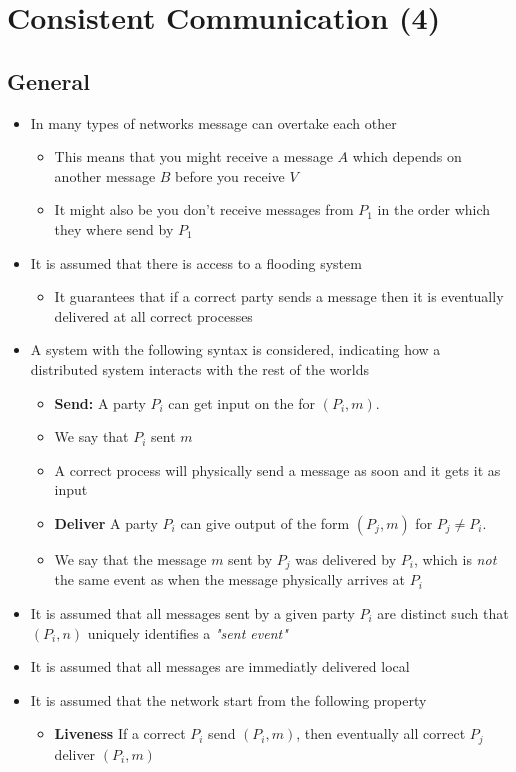 \documentclass[11pt]{article}
\begin{document}
\section{Consistent Communication (4)}
\label{sec:orga70dfb3}
\subsection{General}
\label{sec:orgbbf9d57}
\begin{itemize}
\item In many types of networks message can overtake each other
\begin{itemize}
\item This means that you might receive a message \(A\) which depends on another message \(B\) before you receive \(V\)
\item It might also be you don't receive messages from \(P_1\) in the order which they where send by \(P_1\)
\end{itemize}

\item It is assumed that there is access to a flooding system
\begin{itemize}
\item It guarantees that if a correct party sends a message then it is eventually delivered at all correct processes
\end{itemize}

\item A system with the following syntax is considered, indicating how a distributed system interacts with the rest of the worlds
\begin{itemize}
\item \textbf{Send:} A party \(P_i\) can get input on the for \((P_i,m)\).
\item We say that \(P_i\) sent \(m\)
\item A correct process will physically send a message as soon and it gets it as input
\item \textbf{Deliver} A party \(P_i\) can give output of the form \((P_j,m)\) for \(P_j \ne P_i\).
\item We say that the message \(m\) sent by \(P_j\) was delivered by \(P_i\), which is \emph{not} the same event as when the message physically arrives at \(P_i\)
\end{itemize}

\item It is assumed that all messages sent by a given party \(P_i\) are distinct such that \((P_i,n)\) uniquely identifies a \emph{"sent event"}
\item It is assumed that all messages are immediatly delivered local

\item It is assumed that the network start from the following property
\begin{itemize}
\item \textbf{Liveness} If a correct \(P_i\) send \((P_i,m)\), then eventually all correct \(P_j\) deliver \((P_i,m)\)
\end{itemize}
\end{itemize}
\end{document}

